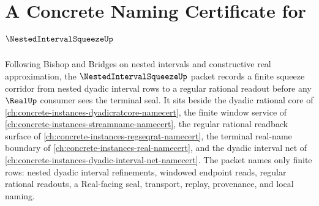 \chapter{A Concrete Naming Certificate for $\NestedIntervalSqueezeUp$}
\label{ch:concrete-instances-nested-interval-squeeze-namecert}

Following Bishop and Bridges on nested intervals and constructive real approximation, the $\NestedIntervalSqueezeUp$ packet records a finite squeeze corridor from nested dyadic interval rows to a regular rational readout before any $\RealUp$ consumer sees the terminal seal. It sits beside the dyadic rational core of \autoref{ch:concrete-instances-dyadicratcore-namecert}, the finite window service of \autoref{ch:concrete-instances-streamname-namecert}, the regular rational readback surface of \autoref{ch:concrete-instances-regseqrat-namecert}, the terminal real-name boundary of \autoref{ch:concrete-instances-real-namecert}, and the dyadic interval net of \autoref{ch:concrete-instances-dyadic-interval-net-namecert}. The packet names only finite rows: nested dyadic interval refinements, windowed endpoint reads, regular rational readouts, a Real-facing seal, transport, replay, provenance, and local naming.

